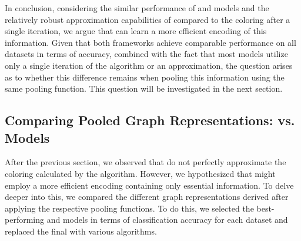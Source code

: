 In conclusion, considering the similar performance of \gnn and \wlnn models and the relatively robust approximation capabilities of \gnns compared to the \wl coloring after a single iteration, we argue that \gnns can learn a more efficient encoding of this information. Given that both frameworks achieve comparable performance on all datasets in terms of accuracy, combined with the fact that most models utilize only a single iteration of the \wl algorithm or an approximation, the question arises as to whether this difference remains when pooling this information using the same pooling function. This question will be investigated in the next section.\todo{!}

\FloatBarrier
\subsection{Comparing Pooled Graph Representations: \gnn vs. \wlnn Models}
After the previous section, we observed that \gnns do not perfectly approximate the coloring calculated by the \wl algorithm. However, we hypothesized that \gnns might employ a more efficient encoding containing only essential information. To delve deeper into this, we compared the different graph representations derived after applying the respective pooling functions. To do this, we selected the best-performing \gnn and \wlnn models in terms of classification accuracy for each dataset and replaced the final \mlp with various algorithms.


